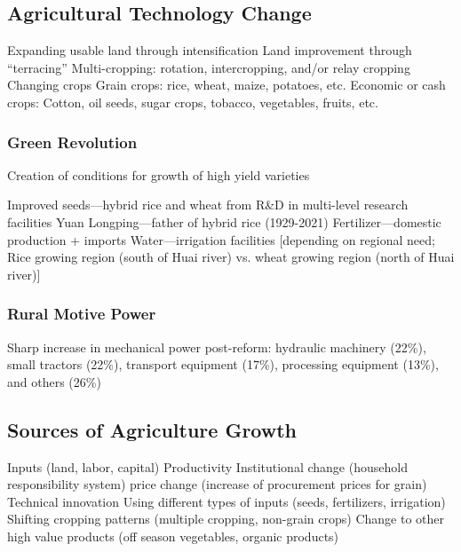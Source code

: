 \documentclass[11pt]{article}
\theoremstyle{definition}
\theoremstyle{remark}
\begin{document}
\subsection{Agricultural Technology Change}
\begin{outline}[enumerate]
\1 Expanding usable land through intensification
	\2 Land improvement through ``terracing''
	\2 Multi-cropping: rotation, intercropping, and/or relay cropping
\1 Changing crops
	\2 Grain crops: rice, wheat, maize, potatoes, etc.
	\2 Economic or cash crops: Cotton, oil seeds, sugar crops, tobacco, vegetables, fruits, etc.
\end{outline}

\subsubsection{Green Revolution}
Creation of conditions for growth of high yield varieties
\begin{outline}[enumerate]
\1 Improved seeds---hybrid rice and wheat from R\&D in multi-level research facilities
	\2 Yuan Longping---father of hybrid rice (1929-2021)
\1 Fertilizer---domestic production + imports
\1 Water---irrigation facilities [depending on regional need; Rice growing region (south of Huai river) vs. wheat growing region (north of Huai river)]
\end{outline}

\subsubsection{Rural Motive Power}
Sharp increase in mechanical power post-reform: hydraulic machinery (22\%), small tractors (22\%), transport equipment (17\%), processing equipment (13\%), and others (26\%)

\subsection{Sources of Agriculture Growth}
\begin{outline}[enumerate]
\1 Inputs (land, labor, capital)
\1 Productivity
	\2 Institutional change (household responsibility system)
	\2 price change (increase of procurement prices for grain)
	\2 Technical innovation
		\3 Using different types of inputs (seeds, fertilizers, irrigation)
		\3 Shifting cropping patterns (multiple cropping, non-grain crops)
		\3 Change to other high value products (off season vegetables, organic products)
\end{outline}
\end{document}
